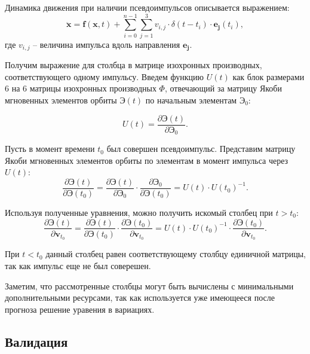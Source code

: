 Динамика движения при наличии псевдоимпульсов описывается выражением:
\begin{equation*}
    \ddot{\mathbf{x}} = \mathbf{f}(\mathbf{x}, t) +
        \sum_{i=0}^{n-1} \sum_{j=1}^{3} v_{i,j} 
                    \cdot \delta (t - t_i) \cdot \mathbf{e_j} (t_i),
\end{equation*}
где $v_{i,j}$ -- величина импульса вдоль направления $\mathbf{e_j}$.

Получим выражение для столбца в матрице изохронных производных, соответствующего одному импульсу.
Введем функцию $U(t)$ как блок размерами 6 на 6 матрицы изохронных производных $\Phi$, отвечающий за
матрицу Якоби мгновенных элементов орбиты $\mathbf{\textbf{Э}}(t)$ по начальным элементам 
$\mathbf{\textbf{Э}}_0$:

\begin{equation*}
    U(t) = \frac{\partial \mathbf{\textbf{Э}}(t)}{\partial \mathbf{\textbf{Э}}_0}.
\end{equation*}

Пусть в момент времени $t_0$ был совершен псевдоимпульс.
Представим матрицу Якоби мгновенных элементов орбиты по элементам в момент импульса через $U(t)$:
\begin{equation*}
    \frac{\partial \mathbf{\textbf{Э}}(t)}{\partial \mathbf{\textbf{Э}}(t_0)} = 
    \frac{\partial \mathbf{\textbf{Э}}(t)}{\partial \mathbf{\textbf{Э}}_0} \cdot
    \frac{\partial \mathbf{\textbf{Э}}_0}{\partial \mathbf{\textbf{Э}}(t_0)} = 
    U(t) \cdot U(t_0)^{-1}.
\end{equation*}

Используя полученные уравнения, можно получить искомый столбец при $t > t_0$:
\begin{equation*}
    \frac{\partial \mathbf{\textbf{Э}}(t)}{\partial \mathbf{v}_{t_0}} = 
    \frac{\partial \mathbf{\textbf{Э}}(t)}{\partial \mathbf{\textbf{Э}}(t_0)} \cdot
    \frac{\partial \mathbf{\textbf{Э}}(t_0)}{\partial \mathbf{v}_{t_0}} =
    U(t) \cdot U(t_0)^{-1} \cdot
    \frac{\partial \mathbf{\textbf{Э}}(t_0)}{\partial \mathbf{v}_{t_0}}.
\end{equation*}

При $t < t_0$ данный столбец равен соответствующему столбцу единичной матрицы, 
так как импульс еще не был соверешен.

Заметим, что рассмотренные столбцы могут быть вычислены с минимальными дополнительными
ресурсами, так как используется уже имеющееся после прогноза решение уравения в вариациях.

\subsection{Валидация}

